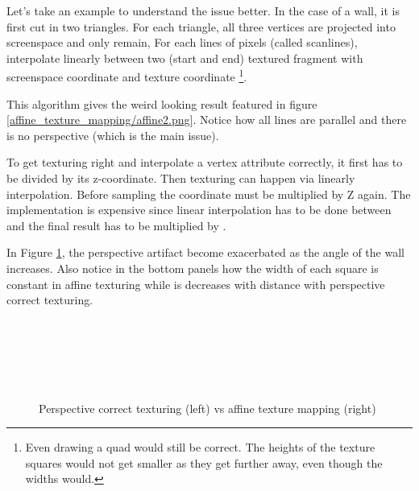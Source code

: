 Let's take an example to understand the issue better. In the case of a wall, it is first cut in two triangles. For each triangle, all three vertices  are projected into screenspace and only  remain, For each lines of pixels (called scanlines), interpolate linearly between two (start and end) textured fragment with screenspace coordinate  and texture coordinate \footnote{ Even drawing a quad would still be correct. The heights of the texture squares would not get smaller as they get further away, even though the widths would.}.\\
\par
This algorithm gives the weird looking result featured in figure \ref{affine_texture_mapping/affine2.png}. Notice how all lines are parallel and there is no perspective (which is the main issue).\\
\par
{}
\par
To get texturing right and interpolate a vertex attribute correctly, it first has to be divided by its z-coordinate. Then texturing can happen via linearly interpolation. Before sampling the coordinate must be multiplied by Z again. The implementation is expensive since linear interpolation has to be done between  and the final result has to be multiplied by .\\
\par
In Figure \ref{texture_anmgle}, the perspective artifact become exacerbated as the angle of the wall increases. Also notice in the bottom panels how the width of each square is constant in affine texturing while is decreases with distance with perspective correct texturing.\\ 
\pagebreak




\par
\begin{figure}[H] \centering
\begin{minipage}{\textwidth}
 \hspace{2cm}
\\
\par

 \hspace{2cm}
\\
\par

 \hspace{2cm}
\\
\par
\end{minipage}
\caption{Perspective correct texturing (left) vs affine texture mapping (right)}
\label{texture_anmgle}
\end{figure}
\par

